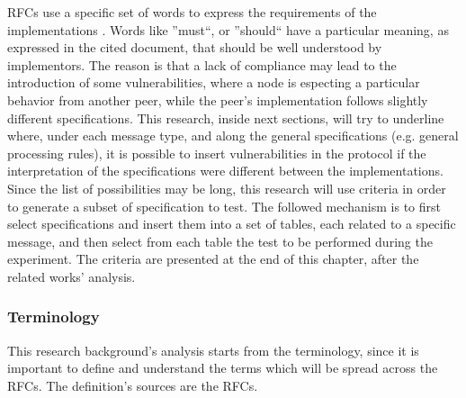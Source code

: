 \documentclass[12pt]{article}
\begin{document}
RFCs use a specific set of words to express the requirements of the implementations \cite{rfc2119}. Words like ''must``, or ''should`` have a particular meaning, as expressed in the cited document, that should be well 
understood by implementors. The reason is that a lack of compliance may lead to the introduction of some vulnerabilities, where a node is especting a particular behavior from another peer, while the peer's implementation 
follows slightly different specifications. This research, inside next sections, will try to underline where, under each message type, and along the general specifications (e.g. general processing rules), it is possible 
to insert vulnerabilities in the protocol if the interpretation of the specifications were different between the implementations.\\
Since the list of possibilities may be long, this research will use criteria in order to generate a subset of specification to test. The followed mechanism is to first select specifications and insert them into a set of 
tables, each related to a specific message, and then select from each table the test to be performed during the experiment. The criteria are presented at the end of this chapter, after the related works' analysis.\\

\pagebreak
\subsubsection{Terminology}
\label{subsub:terminology}

This research background's analysis starts from the terminology, since it is important to define and understand the terms which will be spread across the RFCs. The definition's sources are the RFCs.
\end{document}
